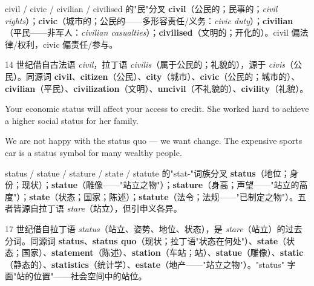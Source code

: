 \documentclass[../main.tex]{subfiles}
\begin{document}

\begin{gram}{civil / civic / civilian / civilised 的"民"分叉}
\textbf{civil}（公民的；民事的；\textit{civil rights}）；\textbf{civic}（城市的；公民的——多形容责任/义务：\textit{civic duty}）；\textbf{civilian}（平民——非军人：\textit{civilian casualties}）；\textbf{civilised}（文明的；开化的）。civil 偏法律/权利，civic 偏责任/参与。
\end{gram}

\begin{origin}
14 世纪借自古法语 \textit{civil}，拉丁语 \textit{civilis}（属于公民的；礼貌的），源于 \textit{civis}（公民）。同源词 \textbf{civil}、\textbf{citizen}（公民）、\textbf{city}（城市）、\textbf{civic}（公民的；城市的）、\textbf{civilian}（平民）、\textbf{civilization}（文明）、\textbf{uncivil}（不礼貌的）、\textbf{civility}（礼貌）。
\end{origin}


{Your economic status will affect your access to credit.}
{She worked hard to achieve a higher social status for her family.}

{We are not happy with the status quo — we want change.}
{The expensive sports car is a status symbol for many wealthy people.}

\begin{gram}{status / statue / stature / state / statute 的"stat-"词族分叉}
\textbf{status}（地位；身份；现状）；\textbf{statue}（雕像——"站立之物"）；\textbf{stature}（身高；声望——"站立的高度"）；\textbf{state}（状态；国家；陈述）；\textbf{statute}（法令；法规——"已制定之物"）。五者皆源自拉丁语 \textit{stare}（站立），但引申义各异。
\end{gram}

\begin{origin}
17 世纪借自拉丁语 \textit{status}（站立、姿势、地位、状态），是 \textit{stare}（站立）的过去分词。同源词 \textbf{status}、\textbf{status quo}（现状；拉丁语"状态在何处"）、\textbf{state}（状态；国家）、\textbf{statement}（陈述）、\textbf{station}（车站；站）、\textbf{statue}（雕像）、\textbf{static}（静态的）、\textbf{statistics}（统计学）、\textbf{estate}（地产——"站立之物"）。"status" 字面"站的位置"——社会空间中的站位。
\end{origin}
\end{document}
